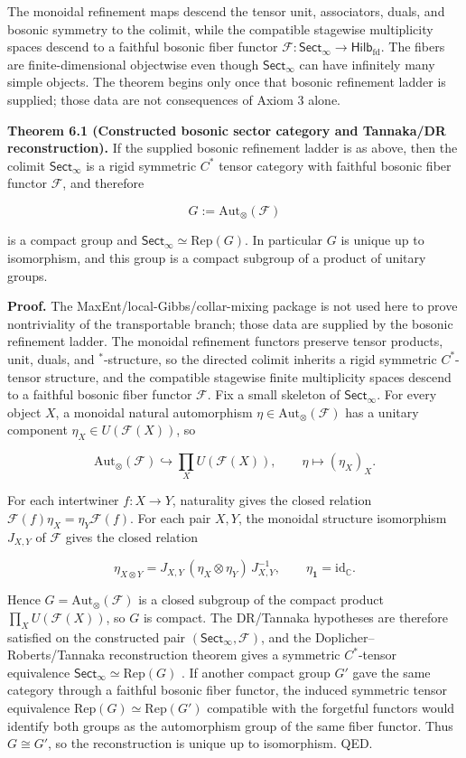 The monoidal refinement maps descend the tensor unit, associators, duals, and bosonic symmetry to the colimit, while the compatible stagewise multiplicity spaces descend to a faithful bosonic fiber functor \(\mathcal F: \mathsf{Sect}_\infty \to \mathsf{Hilb}_{\mathrm{fd}}\). The fibers are finite-dimensional objectwise even though \(\mathsf{Sect}_\infty\) can have infinitely many simple objects. The theorem begins only once that bosonic refinement ladder is supplied; those data are not consequences of Axiom 3 alone.

\textbf{Theorem 6.1 (Constructed bosonic sector category and Tannaka/DR reconstruction).} If the supplied bosonic refinement ladder is as above, then the colimit \(\mathsf{Sect}_\infty\) is a rigid symmetric \(C^*\) tensor category with faithful bosonic fiber functor \(\mathcal F\), and therefore

\[
G := \mathrm{Aut}_\otimes(\mathcal F)
\]

is a compact group and \(\mathsf{Sect}_\infty \simeq \mathrm{Rep}(G)\). In particular \(G\) is unique up to isomorphism, and this group is a compact subgroup of a product of unitary groups.

\textbf{Proof.} The MaxEnt/local-Gibbs/collar-mixing package is not used here to prove nontriviality of the transportable branch; those data are supplied by the bosonic refinement ladder. The monoidal refinement functors preserve tensor products, unit, duals, and \(^*\)-structure, so the directed colimit inherits a rigid symmetric \(C^*\)-tensor structure, and the compatible stagewise finite multiplicity spaces descend to a faithful bosonic fiber functor \(\mathcal F\). Fix a small skeleton of \(\mathsf{Sect}_\infty\). For every object \(X\), a monoidal natural automorphism \(\eta \in \mathrm{Aut}_\otimes(\mathcal F)\) has a unitary component \(\eta_X \in U(\mathcal F(X))\), so

\[
\mathrm{Aut}_\otimes(\mathcal F) \hookrightarrow \prod_X U(\mathcal F(X)), \qquad \eta \mapsto (\eta_X)_X.
\]

For each intertwiner \(f:X\to Y\), naturality gives the closed relation \(\mathcal F(f)\eta_X=\eta_Y\mathcal F(f)\). For each pair \(X,Y\), the monoidal structure isomorphism \(J_{X,Y}\) of \(\mathcal F\) gives the closed relation

\[
\eta_{X\otimes Y}=J_{X,Y}\,(\eta_X\otimes\eta_Y)\,J_{X,Y}^{-1},
\qquad
\eta_{\mathbf 1}=\mathrm{id}_{\mathbb C}.
\]

Hence \(G=\mathrm{Aut}_\otimes(\mathcal F)\) is a closed subgroup of the compact product \(\prod_X U(\mathcal F(X))\), so \(G\) is compact. The DR/Tannaka hypotheses are therefore satisfied on the constructed pair \((\mathsf{Sect}_\infty,\mathcal F)\), and the Doplicher--Roberts/Tannaka reconstruction theorem gives a symmetric \(C^*\)-tensor equivalence \(\mathsf{Sect}_\infty \simeq \mathrm{Rep}(G)\) \cite{dr89,dr90}. If another compact group \(G'\) gave the same category through a faithful bosonic fiber functor, the induced symmetric tensor equivalence \(\mathrm{Rep}(G)\simeq\mathrm{Rep}(G')\) compatible with the forgetful functors would identify both groups as the automorphism group of the same fiber functor. Thus \(G\cong G'\), so the reconstruction is unique up to isomorphism. QED.

